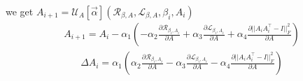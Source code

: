 \newline we get $A_{i+1} = \mathcal{U}_{A}[\vec{\alpha}](\mathcal{R}_{\beta, A},\mathcal{L}_{\beta, A},\beta_i,A_i)$
\begin{equation}
\begin{aligned}
    A_{i+1} = A_{i} -\alpha_1( -\alpha_2 \frac{\partial \mathcal{R}_{\beta_i, A_i}}{\partial A} + \alpha_3 \frac{\partial \mathcal{L}_{\beta_i, A_i}}{\partial A}+\alpha_4 \frac{\partial ||A_iA^\top_i -I||^2_F}{\partial A} )
\end{aligned}
\end{equation}
\begin{equation}
\begin{aligned}
    \Delta A_{i} =  \alpha_1( \alpha_2 \frac{\partial \mathcal{R}_{\beta_i, A_i}}{\partial A} - \alpha_3 \frac{\partial \mathcal{L}_{\beta_i, A_i}}{\partial A}-\alpha_4 \frac{\partial ||A_iA^\top_i -I||^2_F}{\partial A} )
\end{aligned}
\end{equation}

